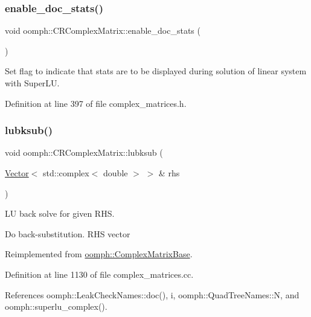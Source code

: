 \subsubsection{\texorpdfstring{enable\+\_\+doc\+\_\+stats()}{enable\_doc\_stats()}}
{\footnotesize\ttfamily void oomph\+::\+C\+R\+Complex\+Matrix\+::enable\+\_\+doc\+\_\+stats (\begin{DoxyParamCaption}{ }\end{DoxyParamCaption})\hspace{0.3cm}{\ttfamily [inline]}}



Set flag to indicate that stats are to be displayed during solution of linear system with Super\+LU. 



Definition at line 397 of file complex\+\_\+matrices.\+h.

\mbox{\label{classoomph_1_1CRComplexMatrix_ac3cac0e74a1ac57526192a37fd9a1f5b}} 
\subsubsection{\texorpdfstring{lubksub()}{lubksub()}}
{\footnotesize\ttfamily void oomph\+::\+C\+R\+Complex\+Matrix\+::lubksub (\begin{DoxyParamCaption}\item[{\hyperlink{classoomph_1_1Vector}{Vector}$<$ std\+::complex$<$ double $>$ $>$ \&}]{rhs }\end{DoxyParamCaption})\hspace{0.3cm}{\ttfamily [virtual]}}



LU back solve for given R\+HS. 

Do back-\/substitution. R\+HS vector 

Reimplemented from \hyperlink{classoomph_1_1ComplexMatrixBase_aa0e444d60d4ec9e35a6903ab88baaf62}{oomph\+::\+Complex\+Matrix\+Base}.



Definition at line 1130 of file complex\+\_\+matrices.\+cc.



References oomph\+::\+Leak\+Check\+Names\+::doc(), i, oomph\+::\+Quad\+Tree\+Names\+::N, and oomph\+::superlu\+\_\+complex().

